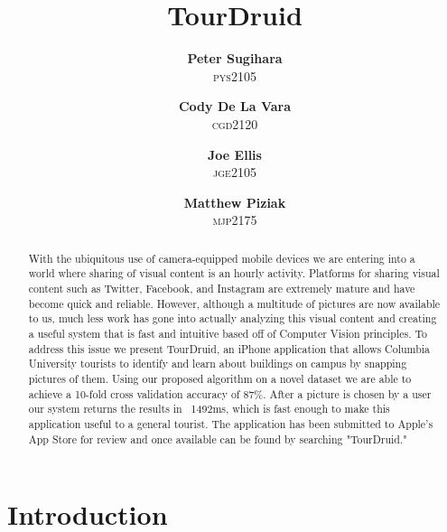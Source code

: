 \documentclass[twocolumn]{article}
\title{TourDruid}
\author{\textbf{Peter Sugihara}\\ \textsc{pys2105}
\and \textbf{Cody De La Vara}\\ \textsc{cgd2120}
\and \textbf{Joe Ellis}\\ \textsc{jge2105}
\and \textbf{Matthew Piziak}\\ \textsc{mjp2175}}
\newcommand{\sectionfile}[3]{\section{#1} \label{sec:#2} }
\begin{document}
\maketitle

\begin{abstract}

With the ubiquitous use of camera-equipped mobile devices we are entering into a world where sharing of visual content is an hourly activity.
Platforms for sharing visual content such as Twitter, Facebook, and Instagram are extremely mature and have become quick and reliable.
However, although a multitude of pictures are now available to us, much less work has gone into actually analyzing this visual content and creating a useful system that is fast and intuitive based off of Computer Vision principles.
To address this issue we present TourDruid, an iPhone application that allows Columbia University tourists to identify and learn about buildings on campus by snapping pictures of them.
Using our proposed algorithm on a novel dataset we are able to achieve a 10-fold cross validation accuracy of 87\%.  
After a picture is chosen by a user our system returns the results in ~1492ms, which is fast enough to make this application useful to a general tourist.
The application has been submitted to Apple's App Store for review and once available can be found by searching "TourDruid."

\end{abstract}


\newpage

\sectionfile{Introduction}{introduction}{introduction.tex}
\end{document}
